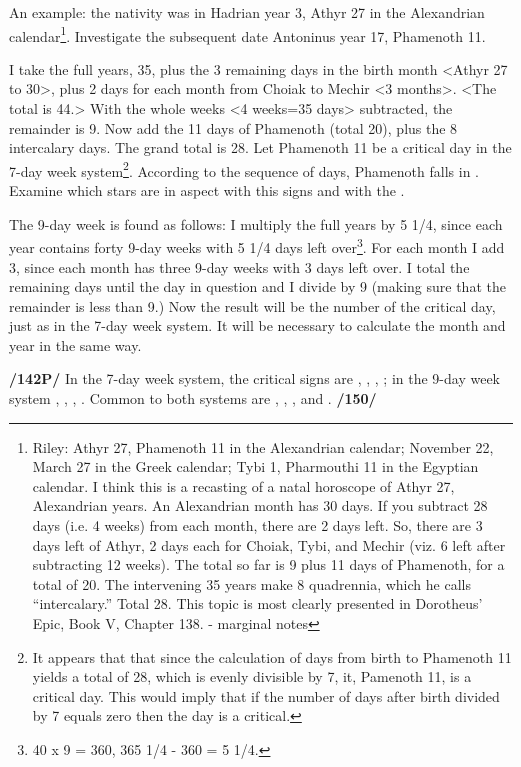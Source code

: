 An example: the nativity was in Hadrian year 3, Athyr 27 in the Alexandrian calendar\footnote{Riley: Athyr 27, Phamenoth 11 in the Alexandrian calendar; November 22, March 27 in the Greek calendar; Tybi 1, Pharmouthi 11 in the Egyptian calendar.
I think this is a recasting of a natal horoscope of Athyr 27, Alexandrian years. An Alexandrian month has 30 days. If you subtract 28 days (i.e. 4 weeks) from each month, there are 2
days left. So, there are 3 days left of Athyr, 2 days each for Choiak, Tybi, and Mechir (viz. 6 left after subtracting 12 weeks). The total so far is 9 plus 11 days of Phamenoth, for a total of 20. The intervening 35 years make 8 quadrennia, which he calls “intercalary.” Total 28. This topic is most clearly presented in Dorotheus’ Epic, Book V, Chapter 138. - marginal notes}. Investigate the subsequent date Antoninus year 17, Phamenoth 11. 

I take the full years, 35, plus the 3 remaining days in the birth month <Athyr 27 to 30>, plus 2 days for each month from Choiak to Mechir <3 months>. <The total is 44.> With the whole weeks <4 weeks=35 days> subtracted, the remainder is 9. Now add the 11 days of Phamenoth (total 20), plus the 8 intercalary days. The grand total is 28. Let Phamenoth 11 be a critical day in the 7-day week system\footnote{It appears that that since the calculation of days from birth to Phamenoth 11 yields a total of 28, which is evenly divisible by 7, it, Pamenoth 11, is a critical day. This would imply that if the number of days after birth divided by 7 equals zero then the day is a critical.}. According to the sequence of days, Phamenoth falls in \Scorpio. Examine which stars are in aspect with this signs and with the \Moon.

The 9-day week is found as follows: I multiply the full years by 5 1/4, since each year contains forty 9-day weeks with 5 1/4 days left over\footnote{40 x 9 = 360, 365 1/4 - 360 = 5 1/4.}. For each month I add 3, since each month has three 9-day weeks with 3 days left over. I total the remaining days until the day in question and I divide by 9 (making sure that the remainder is less than 9.) Now the result will be the number of the critical day, just as in the 7-day week system. It will be necessary to calculate the month and year in the same way.

\textbf{/142P/} In the 7-day week system, the critical signs are \Aries, \Libra, \Cancer, \Capricorn; in the 9-day
week system \Taurus, \Leo, \Scorpio, \Aquarius. Common to both systems are \Gemini, \Sagittarius, \Virgo, and \Pisces. \textbf{/150/}

\newpage